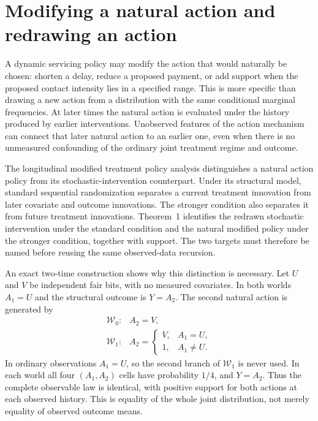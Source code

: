 \section{Modifying a natural action and redrawing an action}
\label{exec17:s5-natural}

A dynamic servicing policy may modify the action that would naturally be
chosen: shorten a delay, reduce a proposed payment, or add support when the
proposed contact intensity lies in a specified range. This is more specific
than drawing a new action from a distribution with the same conditional
marginal frequencies. At later times the natural action is evaluated under
the history produced by earlier interventions. Unobserved features of the
action mechanism can connect that later natural action to an earlier one,
even when there is no unmeasured confounding of the ordinary joint treatment
regime and outcome.

The longitudinal modified treatment policy analysis distinguishes a natural
action policy from its stochastic-intervention counterpart. Under its
structural model, standard sequential randomization separates a current
treatment innovation from later covariate and outcome innovations. The
stronger condition also separates it from future treatment innovations.
Theorem~1 identifies the redrawn stochastic intervention under the standard
condition and the natural modified policy under the stronger condition,
together with support. The two targets must therefore be named before
reusing the same observed-data recursion.~\citep{lmtp2023}

An exact two-time construction shows why this distinction is necessary.
Let $U$ and $V$ be independent fair bits, with no measured covariates. In both
worlds $A_1=U$ and the structural outcome is $Y=A_2$. The second natural action
is generated by
\begin{equation}
 \begin{array}{ll}
 \mathcal W_0:& A_2=V,\\
 \mathcal W_1:&
 A_2=\begin{cases}V,&A_1=U,\\1,&A_1\ne U.\end{cases}
 \end{array}
 \label{exec17:s5-two-worlds}
\end{equation}
In ordinary observations $A_1=U$, so the second branch of $\mathcal W_1$ is
never used. In each world all four $(A_1,A_2)$ cells have probability $1/4$,
and $Y=A_2$. Thus the complete observable law is identical, with positive
support for both actions at each observed history. This is equality of the
whole joint distribution, not merely equality of observed outcome means.

